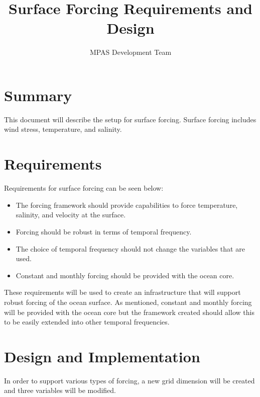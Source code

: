 \documentclass[11pt]{report}
\begin{document}
\title{Surface Forcing Requirements and Design}
\author{MPAS Development Team}

\maketitle
\tableofcontents


\chapter{Summary}

This document will describe the setup for surface forcing. Surface forcing
includes wind stress, temperature, and salinity.


\chapter{Requirements}

Requirements for surface forcing can be seen below:
\begin{itemize}
	\item The forcing framework should provide capabilities to force
		temperature, salinity, and velocity at the surface.
	\item Forcing should be robust in terms of temporal frequency.
	\item The choice of temporal frequency should not change the variables that
		are used.
	\item Constant and monthly forcing should be provided with the ocean core.
\end{itemize}

These requirements will be used to create an infrastructure that will support
robust forcing of the ocean surface. As mentioned, constant and monthly forcing
will be provided with the ocean core but the framework created should allow
this to be easily extended into other temporal frequencies.

\chapter{Design and Implementation}

In order to support various types of forcing, a new grid dimension will be
created and three variables will be modified.
\end{document}
